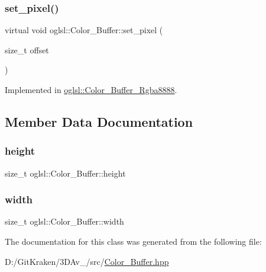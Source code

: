 \subsubsection{\texorpdfstring{set\+\_\+pixel()}{set\_pixel()}\hspace{0.1cm}{\footnotesize\ttfamily [2/2]}}
{\footnotesize\ttfamily virtual void oglsl\+::\+Color\+\_\+\+Buffer\+::set\+\_\+pixel (\begin{DoxyParamCaption}\item[{size\+\_\+t}]{offset }\end{DoxyParamCaption})\hspace{0.3cm}{\ttfamily [pure virtual]}}



Implemented in \mbox{\hyperlink{classoglsl_1_1_color___buffer___rgba8888_a9a62b5f6084af1d6fd1fc7b075c6e025}{oglsl\+::\+Color\+\_\+\+Buffer\+\_\+\+Rgba8888}}.



\subsection{Member Data Documentation}
\mbox{\label{classoglsl_1_1_color___buffer_a18db6640d6dec54b6695821b9dcaf9c5}} 
\subsubsection{\texorpdfstring{height}{height}}
{\footnotesize\ttfamily size\+\_\+t oglsl\+::\+Color\+\_\+\+Buffer\+::height\hspace{0.3cm}{\ttfamily [protected]}}

\mbox{\label{classoglsl_1_1_color___buffer_a520198eca2cfb64729d134d12efae304}} 
\subsubsection{\texorpdfstring{width}{width}}
{\footnotesize\ttfamily size\+\_\+t oglsl\+::\+Color\+\_\+\+Buffer\+::width\hspace{0.3cm}{\ttfamily [protected]}}



The documentation for this class was generated from the following file\+:\begin{DoxyCompactItemize}
\item 
D\+:/\+Git\+Kraken/3\+D\+Av\+\_/src/\mbox{\hyperlink{_color___buffer_8hpp}{Color\+\_\+\+Buffer.\+hpp}}\end{DoxyCompactItemize}
